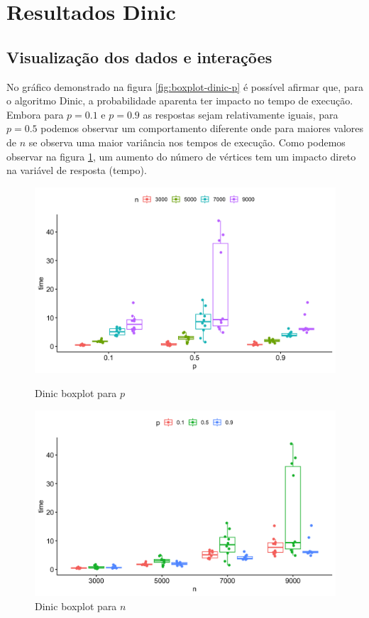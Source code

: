 \documentclass{uofa-eng-assignment}
\begin{document}
\section{Resultados Dinic}

\subsection{Visualização dos dados e interações}
No gráfico demonstrado na figura \ref{fig:boxplot-dinic-p} é possível afirmar que, para o algoritmo Dinic, a probabilidade aparenta ter impacto no tempo de execução. Embora para $p = 0.1$ e $p = 0.9$ as respostas sejam relativamente iguais, para $p = 0.5$ podemos observar um comportamento diferente onde para maiores valores de $n$ se observa uma maior variância nos tempos de execução.
Como podemos observar na figura \ref{fig:boxplot-dinic-n}, um aumento do número de vértices tem um impacto direto na variável de resposta (tempo).

\begin{figure}[h]
    \begin{minipage}{0.45\textwidth}
        \centering
        \includegraphics[width=.7\linewidth]{plot.png}
        \caption{Dinic boxplot para $p$}
        \label{fig:boxplot-dinic-p}
    \end{minipage}
    \hfill
    \begin{minipage}{0.45\textwidth}
        \centering
        \includegraphics[width=.7\linewidth]{plot2.png}
        \caption{Dinic boxplot para $n$}
        \label{fig:boxplot-dinic-n}
    \end{minipage}
\end{figure}
\end{document}

